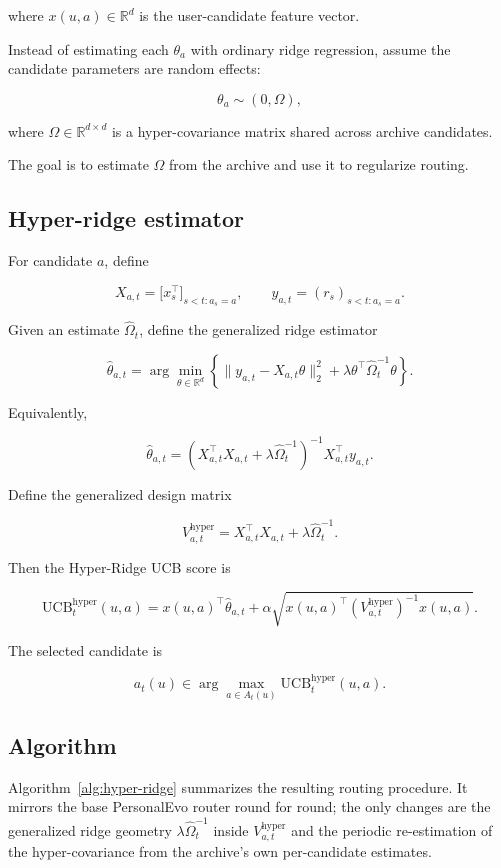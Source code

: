\documentclass{article} %
\begin{document}
where $x(u, a) \in \mathbb{R}^d$ is the user-candidate feature vector.

Instead of estimating each $\theta_a$ with ordinary ridge regression, assume
the candidate parameters are random effects:

\[
\theta_a \sim (0, \Omega),
\]

where $\Omega \in \mathbb{R}^{d \times d}$ is a hyper-covariance matrix shared
across archive candidates.

The goal is to estimate $\Omega$ from the archive and use it to regularize
routing.

\subsection{Hyper-ridge estimator}

For candidate $a$, define

\[
X_{a,t} = \bigl[ x_s^\top \bigr]_{s < t : a_s = a}, \qquad
y_{a,t} = (r_s)_{s < t : a_s = a}.
\]

Given an estimate $\widehat{\Omega}_t$, define the generalized ridge estimator

\[
\widehat{\theta}_{a,t}
= \arg\min_{\theta \in \mathbb{R}^d}
\left\{ \| y_{a,t} - X_{a,t}\theta \|_2^2
      + \lambda \theta^\top \widehat{\Omega}_t^{-1} \theta \right\}.
\]

Equivalently,

\[
\widehat{\theta}_{a,t}
= \left( X_{a,t}^\top X_{a,t} + \lambda \widehat{\Omega}_t^{-1} \right)^{-1}
  X_{a,t}^\top y_{a,t}.
\]

Define the generalized design matrix

\[
V_{a,t}^{\mathrm{hyper}} = X_{a,t}^\top X_{a,t} + \lambda \widehat{\Omega}_t^{-1}.
\]

Then the Hyper-Ridge UCB score is

\[
\mathrm{UCB}_t^{\mathrm{hyper}}(u, a)
= x(u, a)^\top \widehat{\theta}_{a,t}
+ \alpha \sqrt{ x(u, a)^\top \left( V_{a,t}^{\mathrm{hyper}} \right)^{-1} x(u, a) }.
\]

The selected candidate is

\[
a_t(u) \in \arg\max_{a \in A_t(u)} \mathrm{UCB}_t^{\mathrm{hyper}}(u, a).
\]


\subsection{Algorithm}

\label{sec:method-alg}

Algorithm~\ref{alg:hyper-ridge} summarizes the resulting routing procedure.
It mirrors the base PersonalEvo router round for round; the only changes are
the generalized ridge geometry $\lambda \widehat{\Omega}_t^{-1}$ inside
$V_{a,t}^{\mathrm{hyper}}$ and the periodic re-estimation of the
hyper-covariance from the archive's own per-candidate estimates.
\end{document}
